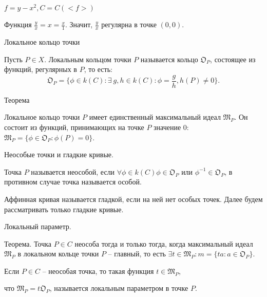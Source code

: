 \documentclass{beamer}
\begin{document}
\begin {frame}
$f = y - x^2, C = C(<f>)$
\newline

Функция $\frac {y}{x} = x = \frac{x}{1}$. Значит, $\frac {y}{x}$ регулярна в точке $(0,0)$.
\end {frame}

\begin {frame}  {Локальное кольцо точки}
\begin {block}

Пусть $P \in X$. Локальным кольцом точки $P$ называется кольцо ${\mathfrak O}_P$, состоящее из функций, регулярных в $P$, то есть: $$ {\mathfrak O}_P = \{ \phi \in k(C) : \exists \ g,h \in k(C) : \phi = \frac{g}{h}, h(P) \ne 0 \}.$$
\end {block}

\begin {block} {Теорема}

Локальное кольцо точки $P$ имеет единственный максимальный идеал ${\mathfrak M}_P$. Он состоит из функций, принимающих на точке $P$ значение 0: ${\mathfrak M}_P = \{\phi \in {\mathfrak O}_P : \phi (P) = 0\}$.
\end {block}
\end {frame}

\begin {frame}  {Неособые точки и гладкие кривые.}

\begin {block}

Точка $P$ называется неособой, если $\forall \phi \in k(C)  \phi \in {\mathfrak O}_P$ или $\phi^{-1} \in {\mathfrak O}_P$, в противном случае точка называется особой.
\end {block}

Аффинная кривая называется гладкой, если на ней нет особых точек. Далее будем рассматривать только гладкие кривые.
\end {frame}

\begin {frame} {Локальный параметр.}
\begin {block} {Теорема.}
Точка $P \in C$ неособа тогда и только тогда, когда максимальный идеал ${\mathfrak M}_P$ в локальном кольце точки $P$ -- главный,  то есть $\exists t \in {\mathfrak M}_P : m =\{ ta : a \in {\mathfrak O}_P\}.$
\end {block}

Если $P \in C$ -- неособая точка, то такая функция $t \in {\mathfrak M}_P$,

что ${\mathfrak M}_P = t{\mathfrak O}_P$, называется локальным параметром в точке $P$.
\end {frame}
\end{document}
